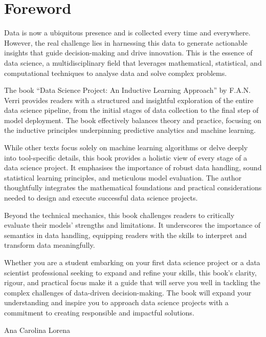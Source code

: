 \chapter{Foreword}

Data is now a ubiquitous presence and is collected every time and everywhere. However, the
real challenge lies in harnessing this data to generate actionable insights that guide
decision-making and drive innovation. This is the essence of data science, a
multidisciplinary field that leverages mathematical, statistical, and computational
techniques to analyse data and solve complex problems.

The book ``Data Science Project: An Inductive Learning Approach'' by F.A.N. Verri provides
readers with a structured and insightful exploration of the entire data science pipeline,
from the initial stages of data collection to the final step of model deployment. The book
effectively balances theory and practice, focusing on the inductive principles
underpinning predictive analytics and machine learning.

While other texts focus solely on machine learning algorithms or delve deeply into
tool-specific details, this book provides a holistic view of every stage of a data science
project. It emphasises the importance of robust data handling, sound statistical learning
principles, and meticulous model evaluation. The author thoughtfully integrates the
mathematical foundations and practical considerations needed to design and execute
successful data science projects.

Beyond the technical mechanics, this book challenges
readers to critically evaluate their models' strengths and limitations. It underscores the
importance of semantics in data handling, equipping readers with the skills to interpret
and transform data meaningfully.

Whether you are a student embarking on your first data science project or a data scientist
professional seeking to expand and refine your skills, this book's clarity, rigour, and
practical focus make it a guide that will serve you well in tackling the complex
challenges of data-driven decision-making. The book will expand your understanding and
inspire you to approach data science projects with a commitment to creating responsible
and impactful solutions.

Ana Carolina Lorena

